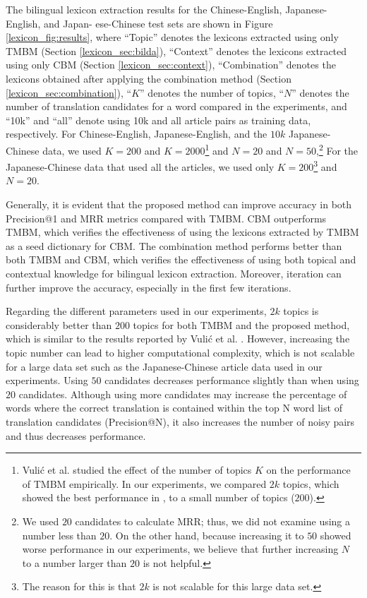 \documentclass[english]{jnlp_1.4}
\begin{document}
The bilingual lexicon extraction results for the Chinese-English, 
Japanese-English, and Japan-
ese-Chinese test sets
are shown in Figure \ref{lexicon_fig:results}, where ``Topic'' denotes the
lexicons extracted using only TMBM (Section \ref{lexicon_sec:bilda}),
``Context'' denotes the lexicons extracted using only CBM
(Section \ref{lexicon_sec:context}), ``Combination'' denotes the
lexicons obtained after applying the combination method
(Section \ref{lexicon_sec:combination}), ``$K$'' denotes the number of topics,
``$N$'' denotes the number of translation candidates for a word
compared in the experiments, and ``10k'' and ``all'' denote using 10k and all 
article pairs as training data, respectively. For Chinese-English, Japanese-English,
and the $10k$ Japanese-Chinese data, we used $K=200$ and $K=2000$\footnote{
Vuli\'{c} et al. \citeyear{vulic-desmet-moens:2011:ACL-HLT2011} studied the effect of the 
number of topics $K$ on the performance of TMBM empirically. In our experiments, we compared 
$2k$ topics, which showed the best performance in \cite{vulic-desmet-moens:2011:ACL-HLT2011}, 
to a small number of topics ($200$).}
and $N=20$ and $N=50$,\footnote{
We used $20$ candidates to calculate MRR; thus, we did not examine using a number less than $20$. 
On the other hand, because increasing it to $50$ showed worse performance in our experiments, we 
believe that further increasing $N$ to a number larger than $20$ is not helpful.}
For the Japanese-Chinese data that used all the articles,
we used only $K=200$\footnote{The reason for this is that
$2k$ is not scalable for this large data set.} and $N=20$.

Generally, it is evident that the proposed method can improve accuracy in both 
Precision@1 and MRR metrics compared with TMBM. CBM outperforms TMBM, which 
verifies the effectiveness of using the lexicons extracted by TMBM as a seed 
dictionary for CBM. The combination method performs better than both TMBM and CBM, 
which verifies the effectiveness of using both topical and contextual knowledge for 
bilingual lexicon extraction. Moreover, iteration can further improve the accuracy, 
especially in the first few iterations.

Regarding the different parameters used in our experiments, $2k$ topics is considerably 
better 
\linebreak
than $200$ topics for both TMBM and the proposed method, which is similar to the 
results reported by Vuli\'{c} et al. \citeyear{vulic-desmet-moens:2011:ACL-HLT2011}. 
However, increasing the topic number can lead 
to higher computational complexity, which is not scalable for a large data set such as 
the Japanese-Chinese article data used in our experiments. Using $50$ candidates decreases 
performance slightly than when using $20$ 
\linebreak
candidates. Although using more candidates may 
increase the percentage of words where the \mbox{correct} translation is contained within the top 
N word list of translation candidates 
\linebreak
(Precision@N), it also increases the number of noisy 
pairs and thus decreases performance.
\end{document}
